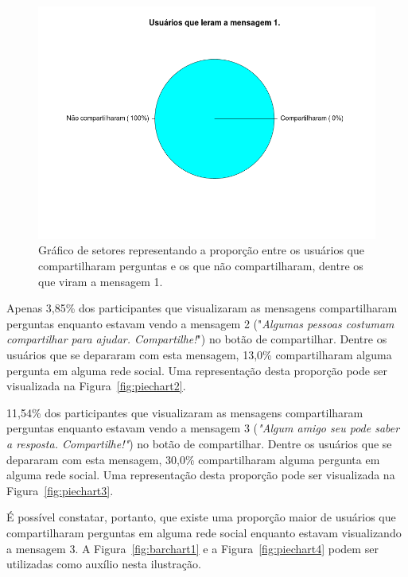     \begin{figure}[H]
        \center
        \includegraphics[scale=0.4]{./figuras/piechart-virammsg1-2.png}
        \caption{Gráfico de setores representando a proporção entre os usuários que compartilharam perguntas e os que não compartilharam, dentre os que viram a mensagem 1.}
        \label{fig:piechart1}
    \end{figure}
    
Apenas 3,85\% dos participantes que visualizaram as mensagens compartilharam perguntas enquanto estavam vendo a mensagem 2 ("\textit{Algumas pessoas costumam compartilhar para ajudar. Compartilhe!}") no botão de compartilhar. Dentre os usuários que se depararam com esta mensagem, 13,0\% compartilharam alguma pergunta em alguma rede social. Uma representação desta proporção pode ser visualizada na Figura~\ref{fig:piechart2}.

11,54\% dos participantes que visualizaram as mensagens compartilharam perguntas enquanto estavam vendo a mensagem 3 (\textit{"Algum amigo seu pode saber a resposta. Compartilhe!"}) no botão de compartilhar. Dentre os usuários que se depararam com esta mensagem, 30,0\% compartilharam alguma pergunta em alguma rede social. Uma representação desta proporção pode ser visualizada na Figura~\ref{fig:piechart3}.

É possível constatar, portanto, que existe uma proporção maior de usuários que compartilharam perguntas em alguma rede social enquanto estavam visualizando a mensagem 3. A Figura~\ref{fig:barchart1}  e a Figura~\ref{fig:piechart4} podem ser utilizadas como auxílio nesta ilustração.

